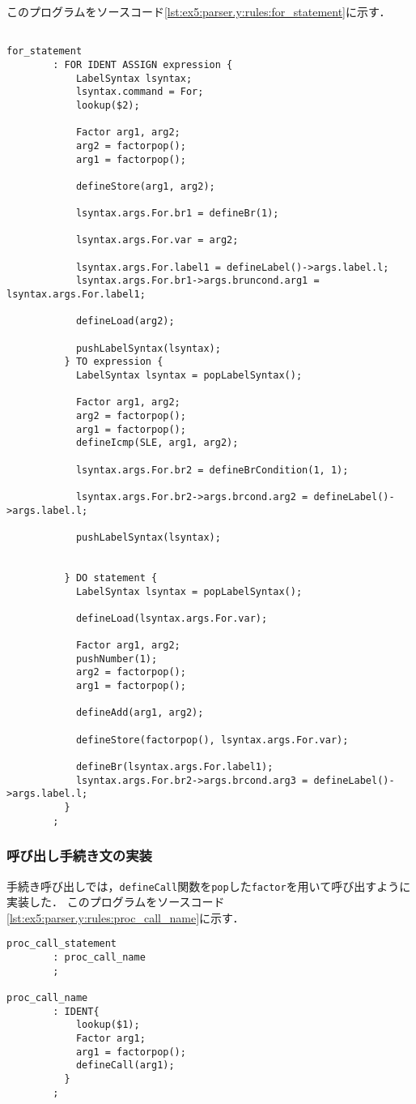 \documentclass[uplatex]{jsarticle}
\begin{document}
このプログラムをソースコード\ref{lst:ex5:parser.y:rules:for_statement}に示す．
\begin{lstlisting}[caption=for文の処理,label=lst:ex5:parser.y:rules:for_statement]

for_statement
        : FOR IDENT ASSIGN expression {
            LabelSyntax lsyntax;
            lsyntax.command = For;
            lookup($2);

            Factor arg1, arg2;
            arg2 = factorpop();
            arg1 = factorpop();

            defineStore(arg1, arg2);

            lsyntax.args.For.br1 = defineBr(1);

            lsyntax.args.For.var = arg2;

            lsyntax.args.For.label1 = defineLabel()->args.label.l;
            lsyntax.args.For.br1->args.bruncond.arg1 = lsyntax.args.For.label1;

            defineLoad(arg2);

            pushLabelSyntax(lsyntax);
          } TO expression {
            LabelSyntax lsyntax = popLabelSyntax();

            Factor arg1, arg2;
            arg2 = factorpop();
            arg1 = factorpop();
            defineIcmp(SLE, arg1, arg2);

            lsyntax.args.For.br2 = defineBrCondition(1, 1);

            lsyntax.args.For.br2->args.brcond.arg2 = defineLabel()->args.label.l;

            pushLabelSyntax(lsyntax);


          } DO statement {
            LabelSyntax lsyntax = popLabelSyntax();

            defineLoad(lsyntax.args.For.var);

            Factor arg1, arg2;
            pushNumber(1);
            arg2 = factorpop();
            arg1 = factorpop();

            defineAdd(arg1, arg2);

            defineStore(factorpop(), lsyntax.args.For.var);

            defineBr(lsyntax.args.For.label1);
            lsyntax.args.For.br2->args.brcond.arg3 = defineLabel()->args.label.l;
          }
        ;
\end{lstlisting}
\subsubsection{呼び出し手続き文の実装}
手続き呼び出しでは，\verb#defineCall#関数を\verb#pop#した\verb#factor#を用いて呼び出すように実装した．
このプログラムをソースコード\ref{lst:ex5:parser.y:rules:proc_call_name}に示す．
\begin{lstlisting}[caption=手続き呼び出しの処理,label=lst:ex5:parser.y:rules:proc_call_name]
proc_call_statement
        : proc_call_name
        ;

proc_call_name
        : IDENT{
            lookup($1);
            Factor arg1;
            arg1 = factorpop();
            defineCall(arg1);
          }
        ;
\end{lstlisting}
\end{document}
